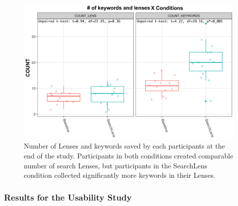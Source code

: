 \documentclass{sigchi}
\begin{document}



\begin{figure}[]
    \centering
    \includegraphics[height=0.6\columnwidth]{figures/LensKeywordsCount3.png}
    \caption{Number of Lenses and keywords saved by each participants at the end of the study. Participants in both conditions created comparable number of search Lenses, but participants in the SearchLens condition collected significantly more keywords in their Lenses.}
    \label{fig:numberOfLenses}
\end{figure}





\subsubsection{Results for the Usability Study}
\end{document}
